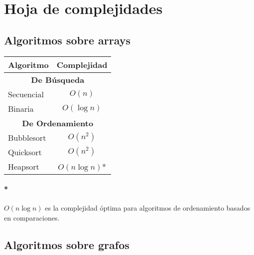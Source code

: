 \appendix
\section{Hoja de complejidades}
\subsection{Algoritmos sobre arrays}
\begin{center}
  \begin{tabular}{|l|c|}
    \hline
    \textbf{Algoritmo} & \textbf{Complejidad}                         \\
    \hline
    \multicolumn{2}{|c|}{\cellcolor{blue!25}\textbf{De Búsqueda}}     \\
    \hline
    Secuencial         & \(O(n)\)                                     \\
    \hline
    Binaria            & \(O(\log{n})\)                               \\
    \hline
    \multicolumn{2}{|c|}{\cellcolor{blue!25}\textbf{De Ordenamiento}} \\
    \hline
    Bubblesort         & \(O(n^2)\)                                   \\
    \hline
    Quicksort          & \(O(n^2)\)                                   \\
    \hline
    Heapsort           & \(O(n\log{n})\)*                             \\
    \hline
  \end{tabular}
\end{center}

\paragraph{*} \(O(n\log{n})\) es la complejidad óptima para algoritmos de ordenamiento basados en comparaciones.

\subsection{Algoritmos sobre grafos}

